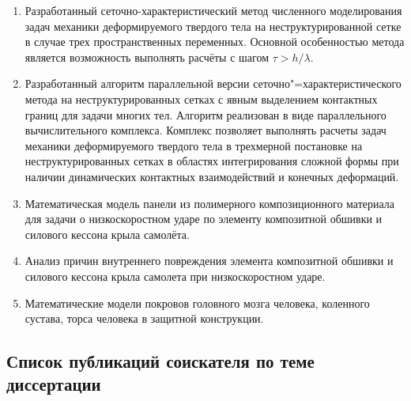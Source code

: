 \begin{enumerate}

\item Разработанный сеточно-характеристический метод численного моделирования задач механики деформируемого твердого тела на неструктурированной сетке в случае трех пространственных переменных. Основной особенностью метода является возможность выполнять расчёты с шагом $\tau > h / \lambda$.

\item Разработанный алгоритм параллельной версии сеточно"=характеристического метода на неструктурированных сетках с явным выделением контактных границ для задачи многих тел. Алгоритм реализован в виде параллельного вычислительного комплекса. Комплекс позволяет выполнять расчеты задач механики деформируемого твердого тела в трехмерной постановке на неструктурированных сетках в областях интегрирования сложной формы при наличии динамических контактных взаимодействий и конечных деформаций.

\item Математическая модель панели из полимерного композиционного материала для задачи о низкоскоростном ударе по элементу композитной обшивки и силового кессона крыла самолёта.

\item Анализ причин внутреннего повреждения элемента композитной обшивки и силового кессона крыла самолета при низкоскоростном ударе.

\item Математические модели покровов головного мозга человека, коленного сустава, торса человека в защитной конструкции.

\end{enumerate}


\subsection*{Список публикаций соискателя по теме диссертации}

